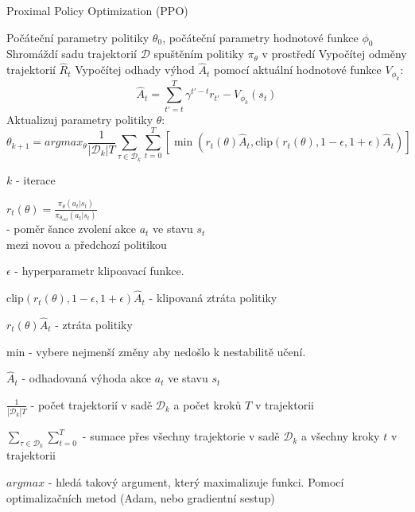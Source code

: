 \begin{algorithm}
  \caption{Proximal Policy Optimization (PPO)}
  \begin{algorithmic}[1]
  \Require Počáteční parametry politiky $\theta_0$, počáteční parametry hodnotové funkce $\phi_0$
      \State Shromáždí sadu trajektorií $\mathcal{D}$ spuštěním politiky $\pi_\theta$ v prostředí
      \State Vypočítej odměny trajektorií $\hat{R}_t$
      \State Vypočítej odhady výhod $\hat{A}_t$ pomocí aktuální hodnotové funkce $V_{\phi_k}$:
      \[
      \hat{A}_t = \sum_{t'=t}^T \gamma^{t'-t} r_{t'} - V_{\phi_k}(s_t)
      \]
      \State Aktualizuj parametry politiky $\theta$:
      \[
        \theta_{k+1} = argmax_{\theta} \frac{1}{\left|\mathcal{D}_k\right|T}\displaystyle\sum_{\tau \in \mathcal{D}_k} \sum_{t=0}^T \left[ \min \left( r_t(\theta) \hat{A}_t, \text{clip}(r_t(\theta), 1-\epsilon, 1+\epsilon) \hat{A}_t \right) \right]
      \]
    \EndFor
  \end{algorithmic}
  \end{algorithm}\pagebreak
  \begin{myitemize}
    \item $k$ - iterace
    \item $r_t(\theta) = \frac{\pi_\theta(a_t|s_t)}{\pi_{\theta_{old}}(a_t|s_t)}$\\ - poměr šance zvolení akce $a_t$ ve stavu $s_t$ \\ mezi novou a předchozí politikou
    \item $\epsilon$ - hyperparametr klipoavací funkce.
    \item $\text{clip}(r_t(\theta), 1-\epsilon, 1+\epsilon) \hat{A}_t$ - klipovaná ztráta politiky
    \item $r_t(\theta) \hat{A}_t$ - ztráta politiky
    \item min -  vybere nejmenší změny aby nedošlo k nestabilitě učení.
    \item $\hat{A}_t$ - odhadovaná výhoda akce $a_t$ ve stavu $s_t$
    \item $\frac{1}{\left|\mathcal{D}_k\right|T}$ - počet trajektorií v sadě $\mathcal{D}_k$ a počet kroků $T$ v trajektorii
    \item $\displaystyle\sum_{\tau \in \mathcal{D}_k} \sum_{t=0}^T$ - sumace přes všechny trajektorie v sadě $\mathcal{D}_k$ a všechny kroky $t$ v trajektorii
    \item $argmax$ - hledá takový argument, který maximalizuje funkci.
    Pomocí optimalizačních metod (Adam, nebo gradientní sestup)
\end{myitemize}



